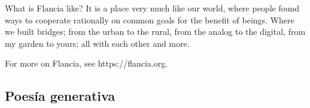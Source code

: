 What is Flancia like? It is a place very much like our world, where people found ways to cooperate rationally on common goals for the benefit of beings. Where we built bridges; from the urban to the rural, from the analog to the digital, from my garden to yours; all with each other and more.

For more on Flancia, see https://flancia.org.

\fleuronb

\subsection*{Poesía generativa}
